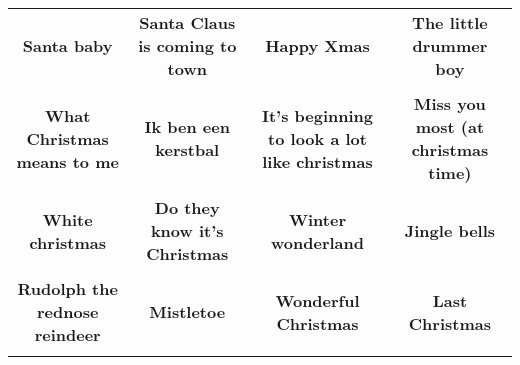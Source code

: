 \documentclass[12pt]{article} \usepackage{eso-pic, graphicx}
\newcommand{\background}[1]{%
\AddToShipoutPictureBG*{\texttt{[image: \#1]}}
}
\begin{document}
\tabcolsep=30.2pt \renewcommand{\arraystretch}{4.5}   \vspace*{4.3cm} \begin{center}  \begin{tabular}{c c c c}
\parbox{3cm}{\centering \textbf{Santa baby}}& 
\parbox{3cm}{\centering \textbf{Santa Claus is coming to town}}& 
\parbox{3cm}{\centering \textbf{Happy Xmas}}& 
\parbox{3cm}{\centering \textbf{The little drummer boy}}\\ \\ 
\parbox{3cm}{\centering \textbf{What Christmas means to me}}& 
\parbox{3cm}{\centering \textbf{Ik ben een kerstbal}}& 
\parbox{3cm}{\centering \textbf{It’s beginning to look a lot like christmas}}& 
\parbox{3cm}{\centering \textbf{Miss you most (at christmas time)}}\\ \\ 
\parbox{3cm}{\centering \textbf{White christmas}}& 
\parbox{3cm}{\centering \textbf{Do they know it's Christmas}}& 
\parbox{3cm}{\centering \textbf{Winter wonderland}}& 
\parbox{3cm}{\centering \textbf{Jingle bells}}\\ \\ 
\parbox{3cm}{\centering \textbf{Rudolph the rednose reindeer}}& 
\parbox{3cm}{\centering \textbf{Mistletoe}}& 
\parbox{3cm}{\centering \textbf{Wonderful Christmas}}& 
\parbox{3cm}{\centering \textbf{Last Christmas}}\\ \\ 
\end{tabular} \background{discobingo.pdf} \end{center} 
\end{document}
